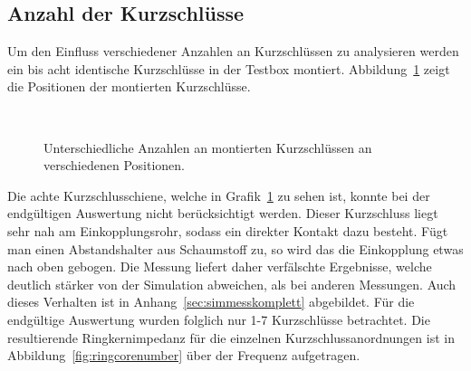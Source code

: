 \subsection{Anzahl der Kurzschl\"usse}
Um den Einfluss verschiedener Anzahlen an Kurzschl\"ussen zu analysieren werden ein bis acht identische Kurzschl\"usse in der Testbox montiert. Abbildung~\ref{fig:ringcorenumberCST} zeigt die Positionen der montierten Kurzschl\"usse.
\begin{figure}[htb]
	\centering
	\hspace{0.0065\textwidth}
	\hspace{0.0065\textwidth}
	\hspace{0.0065\textwidth}
	\\
	\hspace{0.0065\textwidth}
	\hspace{0.0065\textwidth}
	\hspace{0.0065\textwidth}
	\caption{Unterschiedliche Anzahlen an montierten Kurzschl\"ussen an verschiedenen Positionen.}
	\label{fig:ringcorenumberCST}
\end{figure}
\par
Die achte Kurzschlusschiene, welche in Grafik~\ref{fig:ringcorenumberCST} zu sehen ist, konnte bei der endg\"ultigen Auswertung nicht ber\"ucksichtigt werden. Dieser Kurzschluss liegt sehr nah am Einkopplungsrohr, sodass ein direkter Kontakt dazu besteht. F\"ugt man einen Abstandshalter aus Schaumstoff zu, so wird das die Einkopplung etwas nach oben gebogen. Die Messung liefert daher verf\"alschte Ergebnisse, welche deutlich st\"arker von der Simulation abweichen, als bei anderen Messungen. Auch dieses Verhalten ist in Anhang~\ref{sec:simmesskomplett} abgebildet. F\"ur die endg\"ultige Auswertung wurden folglich nur 1-7 Kurzschl\"usse betrachtet. Die resultierende Ringkernimpedanz f\"ur die einzelnen Kurzschlussanordnungen ist in Abbildung~\ref{fig:ringcorenumber} \"uber der Frequenz aufgetragen.


\newpage



